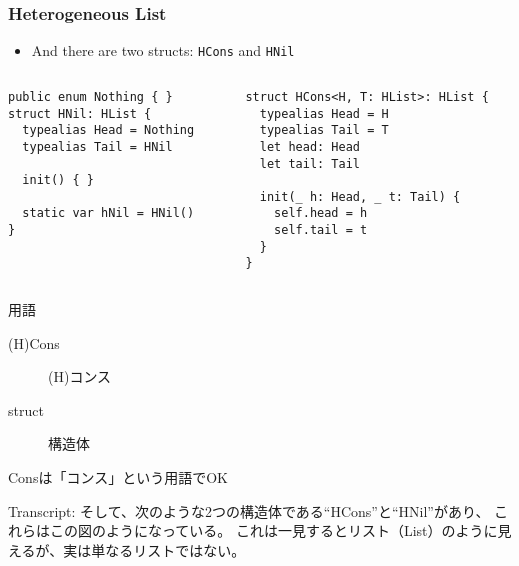 \begin{frame}[fragile]
  \frametitle{Heterogeneous List}

  \begin{itemize}
    \item<+-> And there are two structs: \lstinline|HCons| and \lstinline|HNil|
  \end{itemize}

  \begin{columns}
    \begin{column}{0.45\textwidth}
\begin{lstlisting}[style=swift]
public enum Nothing { }    
struct HNil: HList {
  typealias Head = Nothing
  typealias Tail = HNil
   
  init() { }
   
  static var hNil = HNil()
}   
\end{lstlisting}
    \end{column}
    \begin{column}{0.55\textwidth}
\begin{lstlisting}[style=swift]
struct HCons<H, T: HList>: HList {
  typealias Head = H
  typealias Tail = T
  let head: Head
  let tail: Tail
   
  init(_ h: Head, _ t: Tail) {
    self.head = h
    self.tail = t
  }
}
\end{lstlisting}
    \end{column}
  \end{columns}


  \begin{notes}
    \item 用語
    \begin{description}
      \item[(H)Cons] (H)コンス
      \item[struct] 構造体
    \end{description}

    \item Consは「コンス」という用語でOK

    \item Transcript:
    そして、次のような2つの構造体である``HCons''と``HNil''があり、
    これらはこの図のようになっている。
    これは一見するとリスト（List）のように見えるが、実は単なるリストではない。
  \end{notes}
\end{frame}

